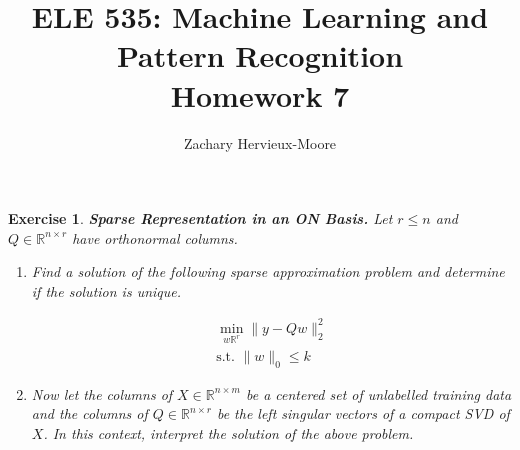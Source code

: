 \documentclass[12pt]{article}
\title{ELE 535: Machine Learning and Pattern Recognition \\ Homework 7}
\author{Zachary Hervieux-Moore}
\date{\displaydate{date}}
\theoremstyle{colon}
\newtheorem{exercise}{Exercise}
\begin{document}
\maketitle

\clearpage

\begin{exercise}
  \textbf{Sparse Representation in an ON Basis.} Let $r \leq n$ and $Q \in \mathbb{R}^{n \times r}$ have orthonormal columns.

  \begin{enumerate}[label=\alph*)]
    \item Find a solution of the following sparse approximation problem and determine if the solution is unique.

      \begin{gather*}
        \min_{w \mathbb{R}^r} \lVert y - Qw \rVert_2^2 \\
        \text{s.t. } \lVert w \rVert_0 \leq k
      \end{gather*}

    \item Now let the columns of $X \in \mathbb{R}^{n \times m}$ be a centered set of unlabelled training data and the columns of $Q \in \mathbb{R}^{n \times r}$ be the left singular vectors of a compact SVD of $X$. In this context, interpret the solution of the above problem.
  \end{enumerate}
\end{exercise}
\end{document}
